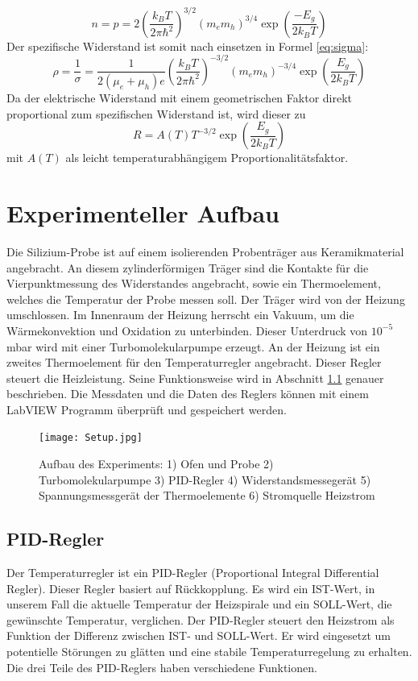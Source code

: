\documentclass[a4paper,parskip,11pt, DIV12]{scrreprt}
\begin{document}
\begin{equation}
n = p = 2 \left(\frac{k_B T}{2 \pi \hbar^2}\right)^{3/2} (m_e m_h)^{3/4} \exp \left(\frac{-E_g}{2 k_B T}\right)
\end{equation}
Der spezifische Widerstand ist somit nach einsetzen in Formel \ref{eq:sigma}:
\begin{equation}
\rho = \frac{1}{\sigma} = \frac{1}{2 (\mu_e + \mu_h)e} \left(\frac{k_B T}{2 \pi \hbar^2}\right)^{-3/2} (m_e m_h)^{-3/4} \exp \left(\frac{E_g}{2 k_B T}\right)
\end{equation}
Da der elektrische Widerstand mit einem geometrischen Faktor direkt proportional zum spezifischen Widerstand ist, wird dieser zu
\begin{equation}
\label{eq:Endloesung}
R = A(T) T^{-3/2} \exp \left(\frac{E_g}{2 k_B T}\right)
\end{equation}
mit $A(T)$ als leicht temperaturabhängigem Proportionalitätsfaktor. 

\section{Experimenteller Aufbau}
Die Silizium-Probe ist auf einem isolierenden Probenträger aus Keramikmaterial angebracht. An diesem zylinderförmigen Träger sind die Kontakte für die Vierpunktmessung des Widerstandes angebracht, sowie ein Thermoelement, welches die Temperatur der Probe messen soll. Der Träger wird von der Heizung umschlossen. Im Innenraum der Heizung herrscht ein Vakuum, um die Wärmekonvektion und Oxidation zu unterbinden. Dieser Unterdruck von $10^{-5}$ mbar wird mit einer Turbomolekularpumpe erzeugt. An der Heizung ist ein zweites Thermoelement für den Temperaturregler angebracht. Dieser Regler steuert die Heizleistung. Seine Funktionsweise wird in Abschnitt \ref{PID_Regler}  genauer beschrieben. Die Messdaten und die Daten des Reglers können mit einem LabVIEW Programm überprüft und gespeichert werden.

\begin{figure}[htbp]
\centering
\texttt{[image: Setup.jpg]}
\caption{Aufbau des Experiments: 1) Ofen und Probe 2) Turbomolekularpumpe 3) PID-Regler 4) Widerstandsmessegerät 5) Spannungsmessgerät der Thermoelemente 6) Stromquelle Heizstrom }
\label{Aufbau}
\end{figure}



\subsection{PID-Regler}
\label{PID_Regler}
Der Temperaturregler ist ein PID-Regler (Proportional Integral Differential Regler). Dieser Regler basiert auf Rückkopplung. Es wird ein IST-Wert, in unserem Fall die aktuelle Temperatur der Heizspirale und ein SOLL-Wert, die gewünschte Temperatur, verglichen. Der PID-Regler steuert den Heizstrom als Funktion der Differenz zwischen IST- und SOLL-Wert. Er wird eingesetzt um potentielle Störungen zu glätten und eine stabile Temperaturregelung zu erhalten. Die drei Teile des PID-Reglers haben verschiedene Funktionen.
\end{document}
